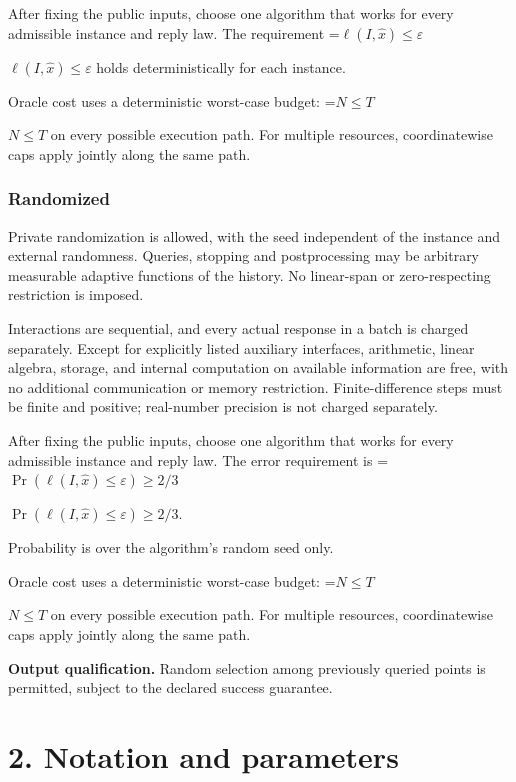 \documentclass[10pt,a4paper]{article}
\newcommand{\AtlasMath}[1]{\par\begingroup\centering\setbox0=\hbox{$\displaystyle #1$}\ifdim\wd0>1.4\linewidth\typeout{ATLAS WIDE FORMULA: \the\wd0}\fi\ifdim\wd0>\linewidth\resizebox{\linewidth}{!}{\box0}\else\box0\fi\par\endgroup}
\newcommand{\AtlasInlineMath}[1]{\begingroup\setbox0=\hbox{$#1$}\ifdim\wd0>.4\linewidth\endgroup\AtlasMath{#1}\else\endgroup$#1$\fi}
\begin{document}
After fixing the public inputs, choose one algorithm that works for every admissible instance and reply law. The requirement \AtlasInlineMath{\ell(I,\widehat{x})\le \varepsilon} holds deterministically for each instance.



Oracle cost uses a deterministic worst-case budget: \AtlasInlineMath{N\le T} on every possible execution path. For multiple resources, coordinatewise caps apply jointly along the same path.



\subsubsection{Randomized}


Private randomization is allowed, with the seed independent of the instance and external randomness. Queries, stopping and postprocessing may be arbitrary measurable adaptive functions of the history. No linear-span or zero-respecting restriction is imposed.



Interactions are sequential, and every actual response in a batch is charged separately. Except for explicitly listed auxiliary interfaces, arithmetic, linear algebra, storage, and internal computation on available information are free, with no additional communication or memory restriction. Finite-difference steps must be finite and positive; real-number precision is not charged separately.



After fixing the public inputs, choose one algorithm that works for every admissible instance and reply law. The error requirement is \AtlasInlineMath{\Pr(\ell(I,\widehat{x})\le \varepsilon)\ge2/3}.



Probability is over the algorithm's random seed only.



Oracle cost uses a deterministic worst-case budget: \AtlasInlineMath{N\le T} on every possible execution path. For multiple resources, coordinatewise caps apply jointly along the same path.



\textbf{Output qualification.} Random selection among previously queried points is permitted, subject to the declared success guarantee.



\section{2. Notation and parameters}
\end{document}
